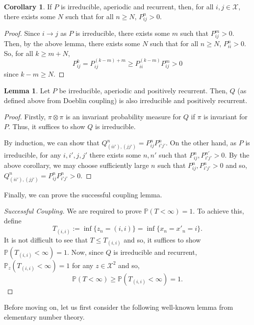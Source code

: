\documentclass[]{article}
\theoremstyle{definition}
\newtheorem{corollary}{Corollary}[theorem]
\theoremstyle{definition}
\newtheorem{lemma}{Lemma}[section]
\begin{document}
\begin{corollary}
  If \(P\) is irreducible, aperiodic and recurrent, then, for all 
  \(i, j \in \mathcal{X}\), there exists some \(N\) such that for all 
  \(n \ge N\), \(P^n_{ij} > 0\).
\end{corollary}
\begin{proof}
  Since \(i \to j\) as \(P\) is irreducible, there exists some \(m\) such that 
  \(P^m_{ij} > 0\). Then, by the above lemma, there exists some \(N\) such that 
  for all \(n \ge N\), \(P^n_{ii} > 0\). So, for all \(k \ge m + N\), 
  \[P^k_{ij} = P^{(k - m) + m}_{ij} \ge P^(k - m)_{ii} P^m_{ij} > 0\]
  since \(k - m \ge N\). 
\end{proof}

\begin{lemma}
  Let \(P\) be irreducible, aperiodic and positively recurrent. Then, \(Q\) 
  (as defined above from Doeblin coupling) is also irreducible and positively 
  recurrent.
\end{lemma}
\begin{proof}
  Firstly, \(\pi \otimes \pi\) is an invariant probability measure for \(Q\) 
  if \(\pi\) is invariant for \(P\). Thus, it suffices to show \(Q\) is irreducible. 

  By induction, we can show that \(Q^n_{(ii'),(jj')} = P^n_{ij} P^n_{i'j'}\). 
  On the other hand, as \(P\) is irreducible, for any \(i, i', j, j'\) there exists 
  some \(n, n'\) such that \(P^n_{ij}, P^{n'}_{i'j'} > 0\). By the above corollary,
  we may choose sufficiently large \(n\) such that \(P^n_{ij}, P^n_{i'j'} > 0\)
  and so, \(Q^n_{(ii'),(jj')} = P^n_{ij} P^n_{i'j'} > 0\).
\end{proof}

Finally, we can prove the successful coupling lemma.

\begin{proof}[Successful Coupling]
  We are required to prove \(\mathbb{P}(T < \infty) = 1\). To achieve this, 
  define 
  \[T_{(i,i)} := \inf \{z_n = (i, i)\} = \inf \{x_n = x'_n = i\}.\]
  It is not difficult to see that \(T \le T_{(i, i)}\) and so, it suffices to 
  show \(\mathbb{P}(T_{(i, i)} < \infty) = 1\). Now, since \(Q\) is irreducible 
  and recurrent, \(\mathbb{P}_z(T_{(i, i)} < \infty) = 1\) for any \(z \in \mathcal{X}^2\) 
  and so, 
  \[\mathbb{P}(T < \infty) \ge \mathbb{P}(T_{(i, i)} < \infty) = 1.\]
\end{proof}

Before moving on, let us first consider the following well-known lemma from 
elementary number theory.
\end{document}
